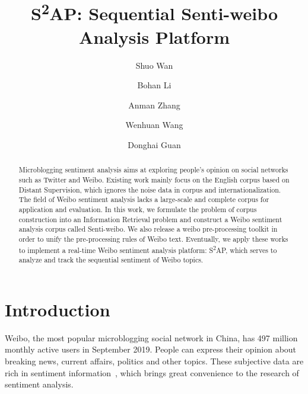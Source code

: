 \documentclass[runningheads]{llncs}
\begin{document}
%
\title{S\textsuperscript{2}AP: Sequential Senti-weibo Analysis Platform}

\author{Shuo Wan \and
Bohan Li \inst{ (}\Envelope\inst{)} \and
Anman Zhang  \and
Wenhuan Wang  \and
Donghai Guan 
}
%
%



%
\maketitle              %
%
\begin{abstract}
Microblogging sentiment analysis aims at exploring people's opinion on social networks such as Twitter and Weibo. Existing work mainly focus on the English corpus based on Distant Supervision, which ignores the noise data in corpus and internationalization. The field of Weibo sentiment analysis lacks a large-scale and complete corpus for application and evaluation. In this work, we formulate the problem of corpus construction into an Information Retrieval problem and construct a Weibo sentiment analysis corpus called Senti-weibo. We also release a weibo pre-processing toolkit in order to unify the pre-processing rules of Weibo text. Eventually, we apply these works to implement a real-time Weibo sentiment analysis platform: S\textsuperscript{2}AP, which serves to analyze and track the sequential sentiment of Weibo topics.


\end{abstract}

\section{Introduction}
Weibo, the most popular microblogging social network in China, has 497 million monthly active users in September 2019. People can express their opinion about breaking news, current affairs, politics and other topics. These subjective data are rich in sentiment information~\cite{zhang2019cyberbullying}, which brings great convenience to the research of sentiment analysis.
\end{document}
